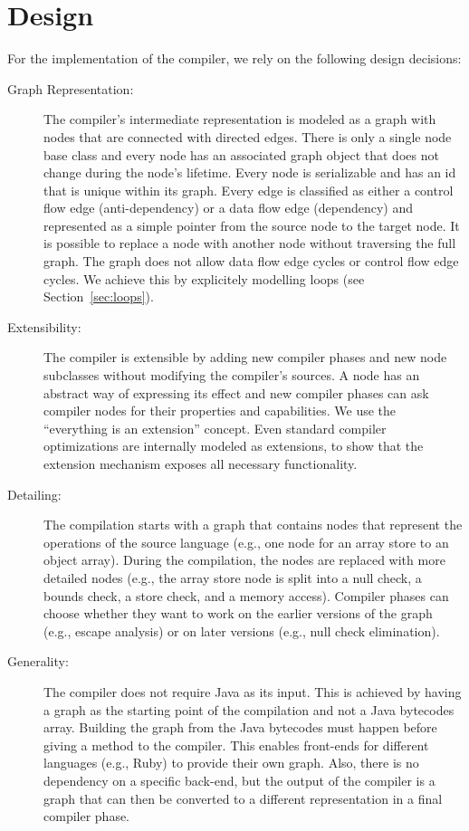 \documentclass[twocolumn]{svjour3}
\begin{document}
\section{Design}
For the implementation of the compiler, we rely on the following design decisions:
\begin{description}
\item[Graph Representation:]
The compiler's intermediate representation is modeled as a graph with nodes that are connected with directed edges.
There is only a single node base class and every node has an associated graph object that does not change during the node's lifetime.
Every node is serializable and has an id that is unique within its graph.
Every edge is classified as either a control flow edge (anti-dependency) or a data flow edge (dependency) and represented as a simple pointer from the source node to the target node.
It is possible to replace a node with another node without traversing the full graph.
The graph does not allow data flow edge cycles or control flow edge cycles.
We achieve this by explicitely modelling loops (see Section~\ref{sec:loops}). 
\item[Extensibility:]
The compiler is extensible by adding new compiler phases and new node subclasses without modifying the compiler's sources.
A node has an abstract way of expressing its effect and new compiler phases can ask compiler nodes for their properties and capabilities.
We use the ``everything is an extension'' concept.
Even standard compiler optimizations are internally modeled as extensions, to show that the extension mechanism exposes all necessary functionality.
\item[Detailing:]
The compilation starts with a graph that contains nodes that represent the operations of the source language (e.g., one node for an array store to an object array).
During the compilation, the nodes are replaced with more detailed nodes (e.g., the array store node is split into a null check, a bounds check, a store check, and a memory access).
Compiler phases can choose whether they want to work on the earlier versions of the graph (e.g., escape analysis) or on later versions (e.g., null check elimination).
\item[Generality:]
The compiler does not require Java as its input.
This is achieved by having a graph as the starting point of the compilation and not a Java bytecodes array.
Building the graph from the Java bytecodes must happen before giving a method to the compiler.
This enables front-ends for different languages (e.g., Ruby) to provide their own graph.
Also, there is no dependency on a specific back-end, but the output of the compiler is a graph that can then be converted to a different representation in a final compiler phase.
\end{description}
\end{document}
